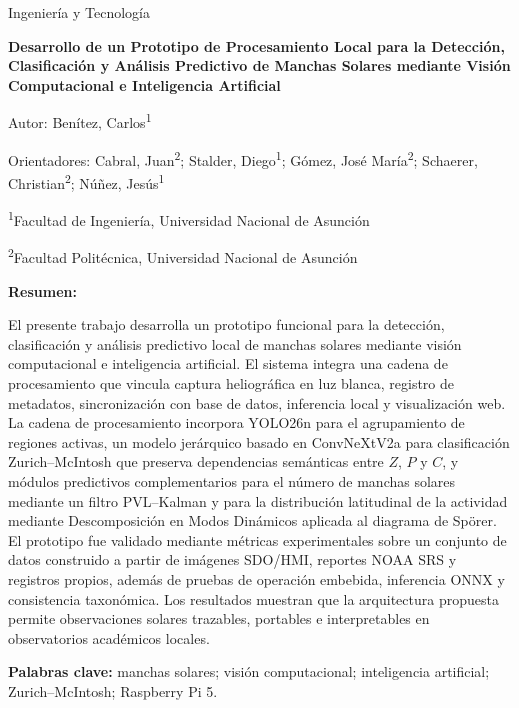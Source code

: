 \documentclass[11pt]{article}
\begin{document}
\begin{center}
Ingeniería y Tecnología

\textbf{Desarrollo de un Prototipo de Procesamiento Local para la Detección, Clasificación y Análisis Predictivo de Manchas Solares mediante Visión Computacional e Inteligencia Artificial}

Autor: Benítez, Carlos\textsuperscript{1}

Orientadores: Cabral, Juan\textsuperscript{2}; Stalder, Diego\textsuperscript{1}; Gómez, José María\textsuperscript{2}; Schaerer, Christian\textsuperscript{2}; Núñez, Jesús\textsuperscript{1}

\textsuperscript{1}Facultad de Ingeniería, Universidad Nacional de Asunción

\textsuperscript{2}Facultad Politécnica, Universidad Nacional de Asunción
\end{center}

\textbf{Resumen:}

El presente trabajo desarrolla un prototipo funcional para la detección, clasificación y análisis predictivo local de manchas solares mediante visión computacional e inteligencia artificial. El sistema integra una cadena de procesamiento que vincula captura heliográfica en luz blanca, registro de metadatos, sincronización con base de datos, inferencia local y visualización web. La cadena de procesamiento incorpora YOLO26n para el agrupamiento de regiones activas, un modelo jerárquico basado en ConvNeXtV2a para clasificación Zurich--McIntosh que preserva dependencias semánticas entre $Z$, $P$ y $C$, y módulos predictivos complementarios para el número de manchas solares mediante un filtro PVL--Kalman y para la distribución latitudinal de la actividad mediante Descomposición en Modos Dinámicos aplicada al diagrama de Spörer. El prototipo fue validado mediante métricas experimentales sobre un conjunto de datos construido a partir de imágenes SDO/HMI, reportes NOAA SRS y registros propios, además de pruebas de operación embebida, inferencia ONNX y consistencia taxonómica. Los resultados muestran que la arquitectura propuesta permite observaciones solares trazables, portables e interpretables en observatorios académicos locales.

\begingroup
\RaggedRight
\textbf{Palabras clave:} manchas solares; visión computacional; inteligencia artificial;\\
Zurich--McIntosh; Raspberry Pi 5.
\par
\endgroup
\end{document}
